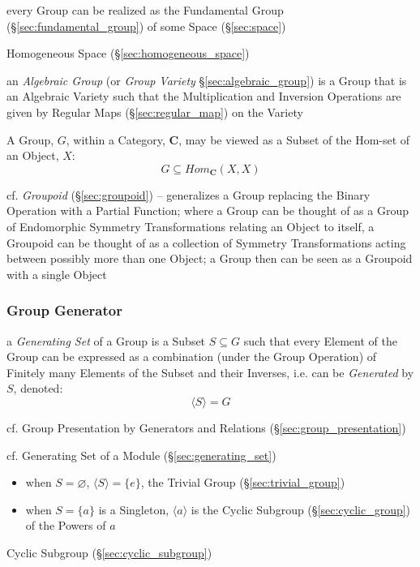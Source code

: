 every Group can be realized as the Fundamental Group
(\S\ref{sec:fundamental_group}) of some Space (\S\ref{sec:space})

\fist Homogeneous Space (\S\ref{sec:homogeneous_space})

\fist an \emph{Algebraic Group} (or \emph{Group Variety}
\S\ref{sec:algebraic_group}) is a Group that is an Algebraic Variety such that
the Multiplication and Inversion Operations are given by Regular Maps
(\S\ref{sec:regular_map}) on the Variety

A Group, $G$, within a Category, $\mathbf{C}$, may be viewed as a Subset of the
Hom-set of an Object, $X$:
\[
    G \subseteq Hom_{\mathbf{C}}(X,X)
\]

\fist cf. \emph{Groupoid} (\S\ref{sec:groupoid}) -- generalizes a Group
replacing the Binary Operation with a Partial Function; where a Group can be
thought of as a Group of Endomorphic Symmetry Transformations relating an Object
to itself, a Groupoid can be thought of as a collection of Symmetry
Transformations acting between possibly more than one Object; a Group then can
be seen as a Groupoid with a single Object



\subsubsection{Group Generator}\label{sec:group_generator}

a \emph{Generating Set} of a Group is a Subset $S \subseteq G$ such that every
Element of the Group can be expressed as a combination (under the Group
Operation) of Finitely many Elements of the Subset and their Inverses, i.e. can
be \emph{Generated} by $S$, denoted:
\[
  \langle{S}\rangle = G
\]

\fist cf. Group Presentation by Generators and Relations
(\S\ref{sec:group_presentation})

cf. Generating Set of a Module (\S\ref{sec:generating_set})

\begin{itemize}
  \item when $S = \varnothing$, $\langle{S}\rangle = \{ e \}$, the Trivial Group
    (\S\ref{sec:trivial_group})
  \item when $S = \{ a \}$ is a Singleton, $\langle{a}\rangle$ is the Cyclic
    Subgroup (\S\ref{sec:cyclic_group}) of the Powers of $a$
\end{itemize}

Cyclic Subgroup (\S\ref{sec:cyclic_subgroup})

